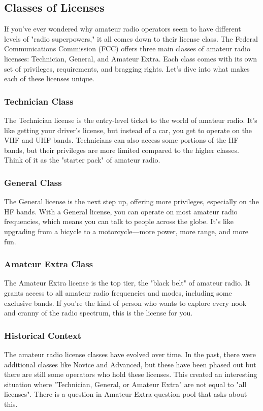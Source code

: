 \subsection{Classes of Licenses}
\label{subsec:license-classes-overview}

If you've ever wondered why amateur radio operators seem to have different levels of "radio superpowers," it all comes down to their license class. The Federal Communications Commission (FCC) offers three main classes of amateur radio licenses: Technician, General, and Amateur Extra. Each class comes with its own set of privileges, requirements, and bragging rights. Let's dive into what makes each of these licenses unique.

\subsubsection*{Technician Class}
The Technician license is the entry-level ticket to the world of amateur radio. It’s like getting your driver's license, but instead of a car, you get to operate on the VHF and UHF bands. Technicians can also access some portions of the HF bands, but their privileges are more limited compared to the higher classes. Think of it as the "starter pack" of amateur radio.

\subsubsection*{General Class}
The General license is the next step up, offering more privileges, especially on the HF bands. With a General license, you can operate on most amateur radio frequencies, which means you can talk to people across the globe. It’s like upgrading from a bicycle to a motorcycle—more power, more range, and more fun.

\subsubsection*{Amateur Extra Class}
The Amateur Extra license is the top tier, the "black belt" of amateur radio. It grants access to all amateur radio frequencies and modes, including some exclusive bands. If you’re the kind of person who wants to explore every nook and cranny of the radio spectrum, this is the license for you.

\subsubsection*{Historical Context}
The amateur radio license classes have evolved over time. In the past, there were additional classes like Novice and Advanced, but these have been phased out but there are still some operators who hold these licenses. This created an interesting situation where "Technician, General, or Amateur Extra" are not equal to "all licenses". There is a question in Amateur Extra question pool that asks about this.


